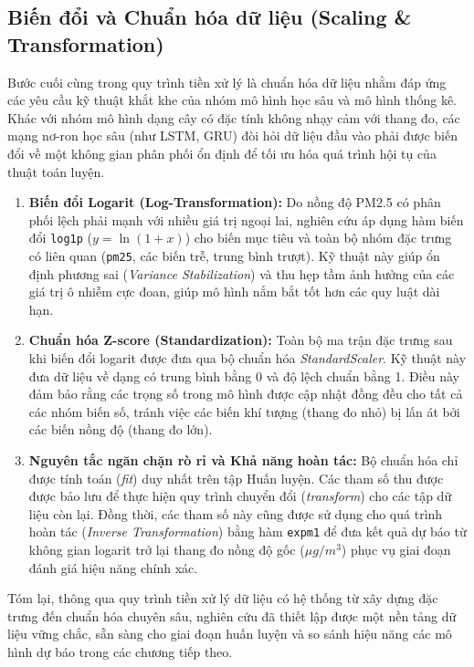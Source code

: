 \subsection{Biến đổi và Chuẩn hóa dữ liệu (Scaling \& Transformation)}
Bước cuối cùng trong quy trình tiền xử lý là chuẩn hóa dữ liệu nhằm đáp ứng các yêu cầu kỹ thuật khắt khe của nhóm mô hình học sâu và mô hình thống kê. Khác với nhóm mô hình dạng cây có đặc tính không nhạy cảm với thang đo, các mạng nơ-ron học sâu (như LSTM, GRU) đòi hỏi dữ liệu đầu vào phải được biến đổi về một không gian phân phối ổn định để tối ưu hóa quá trình hội tụ của thuật toán luyện.
\begin{enumerate}
    \item \textbf{Biến đổi Logarit (Log-Transformation):} Do nồng độ PM2.5 có phân phối lệch phải mạnh với nhiều giá trị ngoại lai, nghiên cứu áp dụng hàm biến đổi \texttt{log1p} ($y = \ln(1+x)$) cho biến mục tiêu và toàn bộ nhóm đặc trưng có liên quan (\texttt{pm25}, các biến trễ, trung bình trượt). Kỹ thuật này giúp ổn định phương sai (\textit{Variance Stabilization}) và thu hẹp tầm ảnh hưởng của các giá trị ô nhiễm cực đoan, giúp mô hình nắm bắt tốt hơn các quy luật dài hạn.
    \item \textbf{Chuẩn hóa Z-score (Standardization):} Toàn bộ ma trận đặc trưng sau khi biến đổi logarit được đưa qua bộ chuẩn hóa \textit{StandardScaler}. Kỹ thuật này đưa dữ liệu về dạng có trung bình bằng 0 và độ lệch chuẩn bằng 1. Điều này đảm bảo rằng các trọng số trong mô hình được cập nhật đồng đều cho tất cả các nhóm biến số, tránh việc các biến khí tượng (thang đo nhỏ) bị lấn át bởi các biến nồng độ (thang đo lớn).
    \item \textbf{Nguyên tắc ngăn chặn rò rỉ và Khả năng hoàn tác:} Bộ chuẩn hóa chỉ được tính toán (\textit{fit}) duy nhất trên tập Huấn luyện. Các tham số thu được được bảo lưu để thực hiện quy trình chuyển đổi (\textit{transform}) cho các tập dữ liệu còn lại. Đồng thời, các tham số này cũng được sử dụng cho quá trình hoàn tác (\textit{Inverse Transformation}) bằng hàm \texttt{expm1} để đưa kết quả dự báo từ không gian logarit trở lại thang đo nồng độ gốc ($\mu g/m^3$) phục vụ giai đoạn đánh giá hiệu năng chính xác.
\end{enumerate}
Tóm lại, thông qua quy trình tiền xử lý dữ liệu có hệ thống từ xây dựng đặc trưng đến chuẩn hóa chuyên sâu, nghiên cứu đã thiết lập được một nền tảng dữ liệu vững chắc, sẵn sàng cho giai đoạn huấn luyện và so sánh hiệu năng các mô hình dự báo trong các chương tiếp theo.